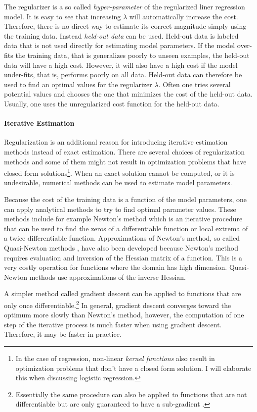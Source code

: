 The regularizer is a so called {\it hyper-parameter} of the
regularized liner regression model. It is easy to see that increasing
$\lambda$ will automatically increase the cost. Therefore, there is no
direct way to estimate its correct magnitude simply using the training
data. Instead {\it held-out data} can be used. Held-out data is
labeled data that is not used directly for estimating model
parameters. If the model over-fits the training data, that is
generalizes poorly to unseen examples, the held-out data will have a
high cost. However, it will also have a high cost if the model
under-fits, that is, performs poorly on all data. Held-out data can
therefore be used to find an optimal values for the regularizer
$\lambda$. Often one tries several potential values and chooses the
one that minimizes the cost of the held-out data. Usually, one uses
the unregularized cost function for the held-out data.

\paragraph{Iterative Estimation} Regularization is an additional
reason for introducing iterative estimation methods instead of exact
estimation. There are several choices of regularization methods and
some of them might not result in optimization problems that have
closed form solutions\footnote{In the case of regression, non-linear
  {\it kernel functions} also result in optimization problems that
  don't have a closed form solution. I will elaborate this when
  discussing logistic regression.}. When an exact solution cannot be
computed, or it is undesirable, numerical methods can be used to
estimate model parameters.

Because the cost of the training data is a function of the model
parameters, one can apply analytical methods to try to find optimal
parameter values. These methods include for example Newton's method
which is an iterative procedure that can be used to find the zeros of
a differentiable function or local extrema of a twice differentiable
function. Approximations of Newton's method, so called Quasi-Newton
methods \cite{somone}, have also been developed because Newton's
method requires evaluation and inversion of the Hessian matrix of a
function. This is a very costly operation for functions where the
domain has high dimension. Quasi-Newton methods use approximations of
the inverse Hessian. 

A simpler method called gradient descent can be applied to functions
that are only once differentiable.\footnote{Essentially the same
  procedure can also be applied to functions that are not
  differentiable but are only guaranteed to have a sub-gradient
  \cite{someone}.} In general, gradient descent converges toward the
optimum more slowly than Newton's method, however, the computation of
one step of the iterative process is much faster when using gradient
descent. Therefore, it may be faster in practice.

